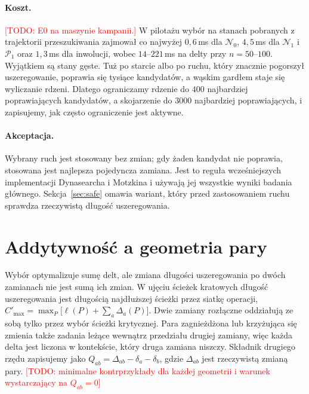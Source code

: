 \documentclass[10pt,twocolumn]{article}
\newcommand{\todo}[1]{\textcolor{red}{[TODO: #1]}}
\newcommand{\N}{\mathcal{N}}
\newcommand{\Pa}{\mathcal{P}}
\begin{document}
\paragraph{Koszt.} \todo{E0 na maszynie kampanii.} W pilotażu wybór na
stanach pobranych z trajektorii przeszukiwania zajmował co najwyżej
$0{,}6$\,ms dla $\N_0$, $4{,}5$\,ms dla $\N_1$ i $\Pa_1$ oraz $1{,}3$\,ms
dla inwolucji, wobec $14$--$221$\,ms na delty przy $n=50$--$100$.
Wyjątkiem są stany gęste. Tuż po starcie albo po ruchu, który znacznie
pogorszył uszeregowanie, poprawia się tysiące kandydatów, a wąskim
gardłem staje się wyliczanie rdzeni. Dlatego ograniczamy rdzenie do $400$
najbardziej poprawiających kandydatów, a skojarzenie do $3000$ najbardziej
poprawiających, i zapisujemy, jak często ograniczenie jest aktywne.

\paragraph{Akceptacja.} Wybrany ruch jest stosowany bez zmian; gdy żaden
kandydat nie poprawia, stosowana jest najlepsza pojedyncza zamiana. Jest to
reguła wcześniejszych implementacji Dynasearcha i Motzkina i używają jej
wszystkie wyniki badania głównego. Sekcja~\ref{sec:safe} omawia wariant,
który przed zastosowaniem ruchu sprawdza rzeczywistą długość
uszeregowania.

\section{Addytywność a geometria pary}\label{sec:additivity}

Wybór optymalizuje sumę delt, ale zmiana długości uszeregowania po dwóch
zamianach nie jest sumą ich zmian. W ujęciu ścieżek kratowych długość
uszeregowania jest długością najdłuższej ścieżki przez siatkę operacji,
$C'_{\max}=\max_P\bigl[\ell(P)+\sum_a\Delta_a(P)\bigr]$. Dwie zamiany
rozłączne oddziałują ze sobą tylko przez wybór ścieżki krytycznej. Para
zagnieżdżona lub krzyżująca się zmienia także zadania leżące wewnątrz
przedziału drugiej zamiany, więc każda delta jest liczona w kontekście,
który druga zamiana niszczy. Składnik drugiego rzędu zapisujemy jako
$Q_{ab}=\Delta_{ab}-\delta_a-\delta_b$, gdzie $\Delta_{ab}$ jest
rzeczywistą zmianą pary. \todo{minimalne kontrprzykłady dla każdej
geometrii i warunek wystarczający na $Q_{ab}=0$}
\end{document}
